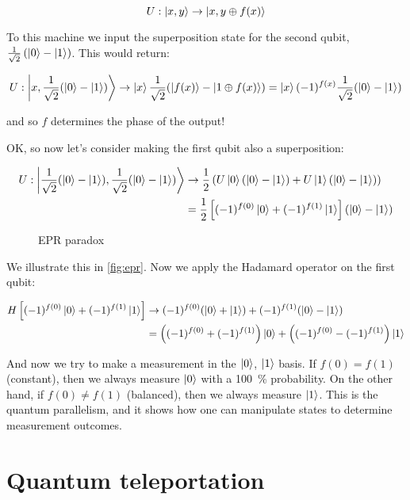 \documentclass[12pt, english]{book}
\begin{document}
\[ U: \ket{x,y} \rightarrow \ket{x, y \oplus f(x)} \]

To this machine we input the superposition state for the second qubit, $\frac{1}{\sqrt{2}}\left( \ket{0} - \ket{1} \right)$.
This would return:

\[ U: \ket{x, \frac{1}{\sqrt{2}} (\ket{0} - \ket{1})} \rightarrow \ket{x} \frac{1}{\sqrt{2}} (\ket{f(x)} - \ket{1 \oplus f(x)}) = \ket{x} (-1)^{f(x)} \frac{1}{\sqrt{2}} ( \ket{0} - \ket{1} )\]

and so $f$ determines the phase of the output! 

OK, so now let's consider making the first qubit also a superposition:

\begin{align*}
	U: \ket{\frac{1}{\sqrt{2}} (\ket{0} - \ket{1}), \frac{1}{\sqrt{2}} (\ket{0} - \ket{1})} &\rightarrow 
	\frac{1}{2} \left( U \ket{0} (\ket{0} - \ket{1}) + U \ket{1} (\ket{0} - \ket{1}) \right) \\
	&= \frac{1}{2} \left[ (-1)^{f(0)} \ket{0} + (-1)^{f(1)} \ket{1} \right]  (\ket{0} - \ket{1}) \\
\end{align*}

\begin{figure}[!ht]
	\centering
	 \hspace{10ex}
	\caption{EPR paradox}
	\label{fig:epr}
\end{figure}

We illustrate this in \autoref{fig:epr}.
Now we apply the Hadamard operator on the first qubit:

\begin{align*}
	H \left[ (-1)^{f(0)} \ket{0} + (-1)^{f(1)} \ket{1} \right] &\rightarrow
	(-1)^{f(0)} (\ket{0} + \ket{1}) + (-1)^{f(1)} (\ket{0} - \ket{1}) \\
	&= \left( (-1)^{f(0)} + (-1)^{f(1)} \right) \ket{0} + \left( (-1)^{f(0)} - (-1)^{f(1)} \right) \ket{1}
\end{align*}

And now we try to make a measurement in the $\ket{0}$, $\ket{1}$ basis. 
If $f(0) = f(1)$ (constant), then we always measure $\ket{0}$ with a \SI{100}{\percent} probability.
On the other hand, if $f(0) \neq f(1)$ (balanced), then we always measure $\ket{1}$.
This is the quantum parallelism, and it shows how one can manipulate states to determine measurement outcomes. 

\section{Quantum teleportation}
\end{document}
